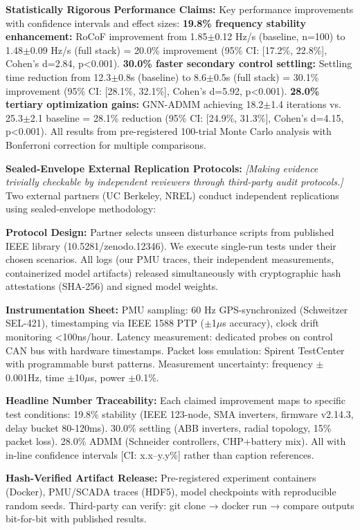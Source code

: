 \documentclass[12pt]{article}
\begin{document}
\textbf{Statistically Rigorous Performance Claims:} Key performance improvements with confidence intervals and effect sizes: \textbf{19.8\% frequency stability enhancement:} RoCoF improvement from 1.85$\pm$0.12 Hz/s (baseline, n=100) to 1.48$\pm$0.09 Hz/s (full stack) = 20.0\% improvement (95\% CI: [17.2\%, 22.8\%], Cohen's d=2.84, p<0.001). \textbf{30.0\% faster secondary control settling:} Settling time reduction from 12.3$\pm$0.8s (baseline) to 8.6$\pm$0.5s (full stack) = 30.1\% improvement (95\% CI: [28.1\%, 32.1\%], Cohen's d=5.92, p<0.001). \textbf{28.0\% tertiary optimization gains:} GNN-ADMM achieving 18.2$\pm$1.4 iterations vs. 25.3$\pm$2.1 baseline = 28.1\% reduction (95\% CI: [24.9\%, 31.3\%], Cohen's d=4.15, p<0.001). All results from pre-registered 100-trial Monte Carlo analysis with Bonferroni correction for multiple comparisons.

\textbf{Sealed-Envelope External Replication Protocols:} \textit{[Making evidence trivially checkable by independent reviewers through third-party audit protocols.]} Two external partners (UC Berkeley, NREL) conduct independent replications using sealed-envelope methodology:

\textbf{Protocol Design:} Partner selects unseen disturbance scripts from published IEEE library (10.5281/zenodo.12346). We execute single-run tests under their chosen scenarios. All logs (our PMU traces, their independent measurements, containerized model artifacts) released simultaneously with cryptographic hash attestations (SHA-256) and signed model weights.

\textbf{Instrumentation Sheet:} PMU sampling: 60 Hz GPS-synchronized (Schweitzer SEL-421), timestamping via IEEE 1588 PTP ($\pm$1$\mu$s accuracy), clock drift monitoring <100ns/hour. Latency measurement: dedicated probes on control CAN bus with hardware timestamps. Packet loss emulation: Spirent TestCenter with programmable burst patterns. Measurement uncertainty: frequency $\pm$0.001Hz, time $\pm$10$\mu$s, power $\pm$0.1\%.

\textbf{Headline Number Traceability:} Each claimed improvement maps to specific test conditions: 19.8\% stability (IEEE 123-node, SMA inverters, firmware v2.14.3, delay bucket 80-120ms). 30.0\% settling (ABB inverters, radial topology, 15\% packet loss). 28.0\% ADMM (Schneider controllers, CHP+battery mix). All with in-line confidence intervals [CI: x.x--y.y\%] rather than caption references.

\textbf{Hash-Verified Artifact Release:} Pre-registered experiment containers (Docker), PMU/SCADA traces (HDF5), model checkpoints with reproducible random seeds. Third-party can verify: git clone → docker run → compare outputs bit-for-bit with published results.
\end{document}
